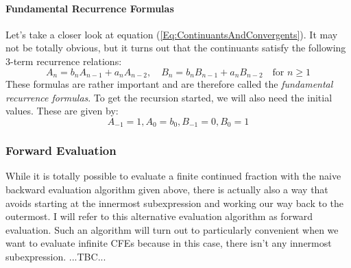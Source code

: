 




\paragraph{Fundamental Recurrence Formulas}
Let's take a closer look at equation (\ref{Eq:ContinuantsAndConvergents}). It may not be totally obvious, but it turns out that the continuants satisfy the following 3-term recurrence relations:
\begin{equation}
A_n = b_n A_{n-1} + a_n A_{n-2}, \quad
B_n = b_n B_{n-1} + a_n B_{n-2}  \quad
\text{for }  n \geq 1
\end{equation}
These formulas are rather important and are therefore called the \emph{fundamental recurrence formulas}.
To get the recursion started, we will also need the initial values. These are given by:
\begin{equation}
A_{-1} = 1, A_0 = b_0, B_{-1} = 0, B_0 = 1
\end{equation}




\subsubsection{Forward Evaluation}
While it is totally possible to evaluate a finite continued fraction with the naive backward evaluation algorithm given above, there is actually also a way that avoids starting at the innermost subexpression and working our way back to the outermost. I will refer to this alternative evaluation algorithm as forward evaluation. Such an algorithm will turn out to particularly convenient when we want to evaluate infinite CFEs because in this case, there isn't any innermost subexpression. ...TBC...





